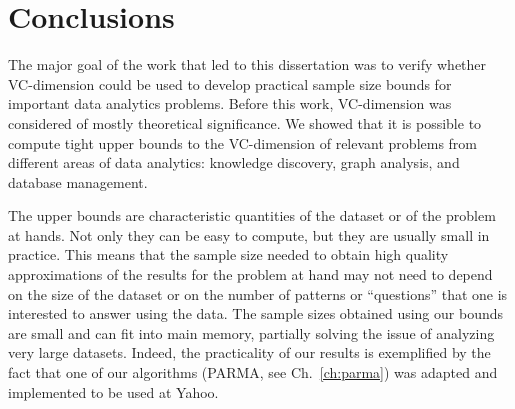 \chapter{Conclusions}\label{ch:conclusions}

The major goal of the work that led to this dissertation was to verify whether
VC-dimension could be used to develop practical sample size bounds for important
data analytics problems. Before this work, VC-dimension was considered of mostly
theoretical significance. We showed that it is possible to compute tight upper
bounds to the VC-dimension of relevant problems from different areas of data
analytics: knowledge discovery, graph analysis, and database management. 

The upper bounds are characteristic quantities of the dataset or of the
problem at hands. Not only they can be easy to compute, but they are usually
small in practice. This means that the sample size needed to obtain high quality
approximations of the results for the problem at hand may not need to depend on
the size of the dataset or on the number of patterns or ``questions'' that one
is interested to answer using the data. The sample sizes obtained using our
bounds are small and can fit into main memory, partially solving the issue of
analyzing very large datasets. Indeed, the practicality of our results is
exemplified by the fact that one of our algorithms (PARMA, see
Ch.~\ref{ch:parma}) was adapted and implemented to be used at Yahoo.


